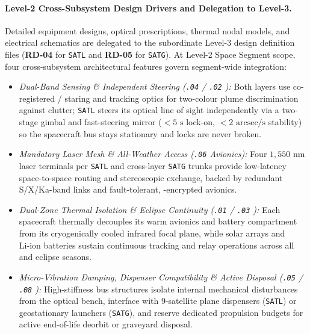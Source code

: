 \begin{table}[htbp]
{\begin{tabularx}{\textwidth}{|>{\raggedright\arraybackslash}p{2.2cm}|>{\raggedright\arraybackslash}p{2.0cm}|>{\raggedright\arraybackslash}X|>{\raggedright\arraybackslash}p{2.2cm}|>{\raggedright\arraybackslash}p{2.3cm}|}
\end{tabularx}}
\end{table}

\paragraph{Level-2 Cross-Subsystem Design Drivers and Delegation to Level-3.}
Detailed equipment designs, optical prescriptions, thermal nodal models, and electrical schematics are delegated to the subordinate Level-3 design definition files (\textbf{RD-04} for \texttt{SATL} and \textbf{RD-05} for \texttt{SATG}). At Level-2 Space Segment scope, four cross-subsystem architectural features govern segment-wide integration:
\begin{itemize}[leftmargin=1.4em, itemsep=0.3em, topsep=0.3em]
    \item \emph{Dual-Band Sensing \& Independent  Steering (\texttt{.04}  / \texttt{.02} ):} Both layers use co-registered / staring and tracking optics for two-colour plume discrimination against clutter; \texttt{SATL} steers its optical line of sight independently via a two-stage gimbal and fast-steering mirror ($< 5\text{ s}$ lock-on, $< 2\text{ arcsec/s}$ stability) so the spacecraft bus stays stationary and  locks are never broken.
    \item \emph{Mandatory Laser Mesh \& All-Weather  Access (\texttt{.06} Avionics):} Four $1{,}550\text{ nm}$ laser terminals per \texttt{SATL} and cross-layer \texttt{SATG} trunks provide low-latency space-to-space routing and stereoscopic  exchange, backed by redundant S/X/Ka-band  links and fault-tolerant, -encrypted avionics.
    \item \emph{Dual-Zone Thermal Isolation \& Eclipse Continuity (\texttt{.01}  / \texttt{.03} ):} Each spacecraft thermally decouples its warm avionics and battery compartment from its cryogenically cooled infrared focal plane, while solar arrays and $\mathrm{Li\text{-}ion}$ batteries sustain continuous tracking and relay operations across all  and  eclipse seasons.
    \item \emph{Micro-Vibration Damping, Dispenser Compatibility \& Active Disposal (\texttt{.05}  / \texttt{.08} ):} High-stiffness bus structures isolate internal mechanical disturbances from the optical bench, interface with 9-satellite plane dispensers (\texttt{SATL}) or geostationary launchers (\texttt{SATG}), and reserve dedicated propulsion budgets for active end-of-life deorbit or graveyard disposal.
\end{itemize}
